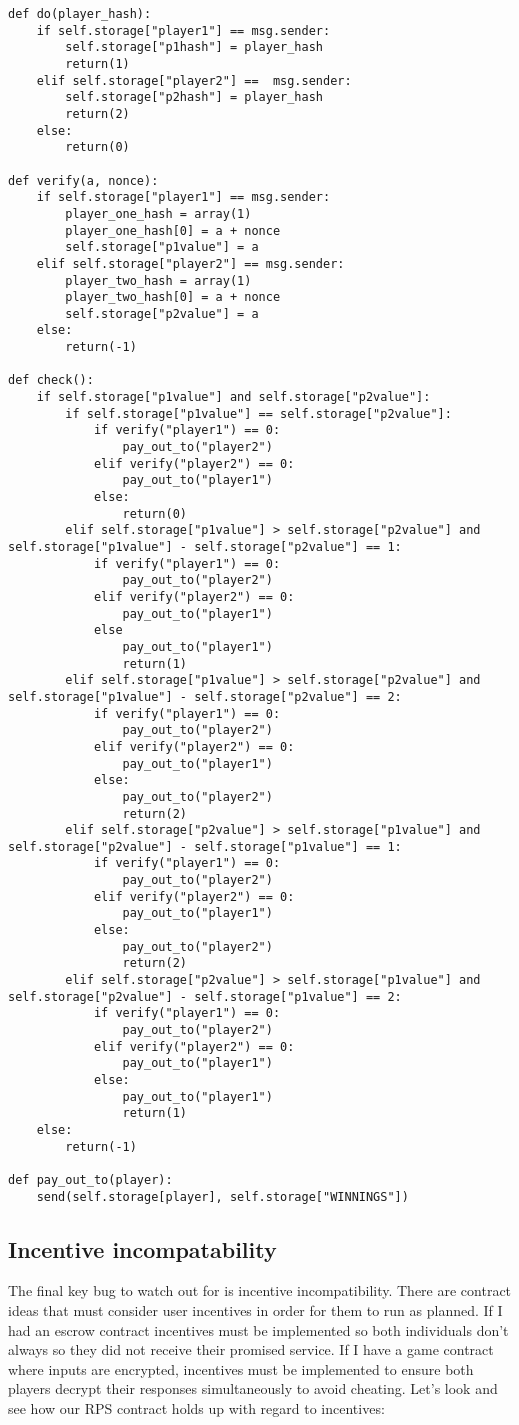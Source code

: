 \documentclass[12pt]{article}
\begin{document}
\begin{lstlisting}
def do(player_hash):
	if self.storage["player1"] == msg.sender:
		self.storage["p1hash"] = player_hash
		return(1)
	elif self.storage["player2"] ==  msg.sender:
		self.storage["p2hash"] = player_hash
		return(2)
	else:
		return(0)

def verify(a, nonce):
	if self.storage["player1"] == msg.sender:
		player_one_hash = array(1)
		player_one_hash[0] = a + nonce
		self.storage["p1value"] = a
	elif self.storage["player2"] == msg.sender:
		player_two_hash = array(1)
		player_two_hash[0] = a + nonce
		self.storage["p2value"] = a
	else:
		return(-1)

def check():
	if self.storage["p1value"] and self.storage["p2value"]:
		if self.storage["p1value"] == self.storage["p2value"]:
			if verify("player1") == 0:
				pay_out_to("player2")
			elif verify("player2") == 0:
				pay_out_to("player1")
			else:
				return(0)
		elif self.storage["p1value"] > self.storage["p2value"] and self.storage["p1value"] - self.storage["p2value"] == 1:
			if verify("player1") == 0:
				pay_out_to("player2")
			elif verify("player2") == 0:
				pay_out_to("player1")
			else
				pay_out_to("player1") 
				return(1)
		elif self.storage["p1value"] > self.storage["p2value"] and self.storage["p1value"] - self.storage["p2value"] == 2:
			if verify("player1") == 0:
				pay_out_to("player2")
			elif verify("player2") == 0:
				pay_out_to("player1")
			else:
				pay_out_to("player2")
				return(2)
		elif self.storage["p2value"] > self.storage["p1value"] and self.storage["p2value"] - self.storage["p1value"] == 1:
			if verify("player1") == 0:
				pay_out_to("player2")
			elif verify("player2") == 0:
				pay_out_to("player1")
			else:
				pay_out_to("player2")		
				return(2)
		elif self.storage["p2value"] > self.storage["p1value"] and self.storage["p2value"] - self.storage["p1value"] == 2:
			if verify("player1") == 0:
				pay_out_to("player2")
			elif verify("player2") == 0:
				pay_out_to("player1")
			else:
				pay_out_to("player1")		
				return(1)
	else:
		return(-1)

def pay_out_to(player):
	send(self.storage[player], self.storage["WINNINGS"])
\end{lstlisting}




\subsection{Incentive incompatability}
The final key bug to watch out for is incentive incompatibility. There are contract ideas that must consider user incentives in order for them to run as planned. If I had an escrow contract incentives must be implemented so both individuals don't always so they did not receive their promised service. If I have a game contract where inputs are encrypted, incentives must be implemented to ensure both players decrypt their responses simultaneously to avoid cheating. Let's look and see how our RPS contract holds up with regard to incentives:
\end{document}
